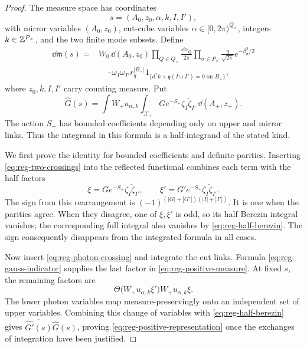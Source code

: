 \begin{proof}
The measure space has coordinates
\[
 s=(A_0,z_0,\alpha,k,I,I'),
\]
with mirror variables $(A_0,z_0)$, cut-cube variables
$\alpha\in[0,2\pi)^{Q_\times}$, integers $k\in\mathbb Z^{P_\times}$, and
the two finite mode subsets. Define
\begin{align}\label{eq:reg-positive-measure}
 \dd\mathfrak m(s)={}&W_0\,\dd(A_0,z_0)
     \prod_{Q\in Q_\times}\frac{\dd\alpha_Q}{2\pi}
     \prod_{\sigma\in P_\times}
                         \frac{q}{\sqrt{2\pi}}e^{-\beta_\sigma^2/2}
 \nonumber\\
 &\quad\cdot\omega_I\omega_{I'}r_q^{|B_\times|}
        1_{\{d^*k+\mathfrak q(I\cup I')=0\text{ on }B_\times\}},
\end{align}
where $z_0,k,I,I'$ carry counting measure. Put
\begin{equation}\label{eq:reg-half-transform}
 \widehat G(s)=\int W_+u_{\alpha,k}
         \int_{\mathcal X_+}G e^{-S_+}\zeta_I\check\zeta_{I'}
                                      \,\dd(A_+,z_+).
\end{equation}
The action $S_+$ has bounded coefficients depending only on upper
and mirror links. Thus the integrand in this formula is a
half-integrand of the stated kind.

We first prove the identity for bounded coefficients and definite
parities. Inserting \eqref{eq:reg-two-crossings} into the reflected
functional combines each term with the half factors
\[
 \xi=G e^{-S_+}\zeta_I\check\zeta_{I'},\qquad
 \xi'=G'e^{-S_+}\zeta_I\check\zeta_{I'}.
\]
The sign from this rearrangement is
$(-1)^{(|G|+|G'|)(|I|+|I'|)}$. It is one when the parities agree.
When they disagree, one of $\xi,\xi'$ is odd, so its half Berezin
integral vanishes; the corresponding full integral also vanishes
by \eqref{eq:reg-half-berezin}. The sign consequently disappears
from the integrated formula in all cases.

Now insert \eqref{eq:reg-photon-crossing} and integrate the cut
links. Formula \eqref{eq:reg-gauss-indicator} supplies the last
factor in \eqref{eq:reg-positive-measure}. At fixed $s$, the
remaining factors are
\[
 \Theta\bigl(W_+u_{\alpha,k}\xi'\bigr)
                    W_+u_{\alpha,k}\xi.
\]
The lower photon variables map measure-preservingly onto an
independent set of upper variables. Combining this change of
variables with \eqref{eq:reg-half-berezin} gives
$\overline{\widehat{G'}(s)}\widehat G(s)$, proving
\eqref{eq:reg-positive-representation} once the exchanges of
integration have been justified.


\end{proof}
